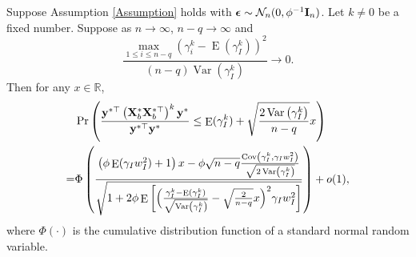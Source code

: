 \documentclass[smallextended]{svjour3}       %
\DeclareMathOperator{\myE}{E}
\DeclareMathOperator{\myVar}{Var}
\DeclareMathOperator{\myCov}{Cov}
\newcommand{\By}{\mathbf{y}}    \newcommand{\Bz}{\mathbf{z}}
\begin{document}
\begin{theorem}\label{generalTheorem}
    Suppose Assumption \ref{Assumption} holds with $\boldsymbol{\epsilon}\sim \mathcal N_n (0,\phi^{-1} \mathbf{I}_n)$.
    Let $k\neq 0$ be a fixed number.
    Suppose as $n\to \infty$, $n-q\to \infty$ and
\begin{equation}
    \frac{
        \max_{1\leq i \leq n-q}
        \left( 
        \gamma_i^k
            -
                \myE (\gamma_I^k)
        \right)^2
    }{
        (n-q) \myVar (\gamma_I^k)
    }\to 0.
    \label{eq:toBeCondition}
\end{equation}
Then for any $x\in \mathbb R$,
\begin{equation*}
    \begin{split}
    &\Pr\left( 
        \frac{
            \By^{*\top} \left( \BX_b^* \BX_b^{*\top} \right)^k \By^*
        }{
            \By^{*\top} \By^*
        } 
        \leq 
        \myE (\gamma_I^k)
        +\sqrt{
            \frac{2\myVar\left( \gamma_I^k \right)}{n-q} 
        }
        x
    \right) 
    \\
    =&
    \Phi\left( 
        \frac{
            \left( \phi \myE (\gamma_I w_I^2) + 1 \right)
            x
            -
            \phi
            \sqrt{n-q}
            \frac{
            \myCov\left( \gamma_I^k, \gamma_I w_I^2 \right)
            }{
\sqrt{2 \myVar\left( \gamma_I^k \right)}
            }
        }{
            \sqrt{
                1
                +
                2 \phi
     \myE\left[ 
         \Big( \frac{\gamma_I^k -\myE(\gamma_I^k)}{\sqrt{\myVar\left( \gamma_I^k \right)}} -\sqrt{\frac{2}{n-q}}x \Big)^2
        \gamma_I w_I^2
    \right]
            }
        } 
    \right)
    +o(1)
    ,
    \end{split}
\end{equation*}
where $\Phi(\cdot)$ is the cumulative distribution function of a standard normal random variable.



\end{theorem}
\end{document}
